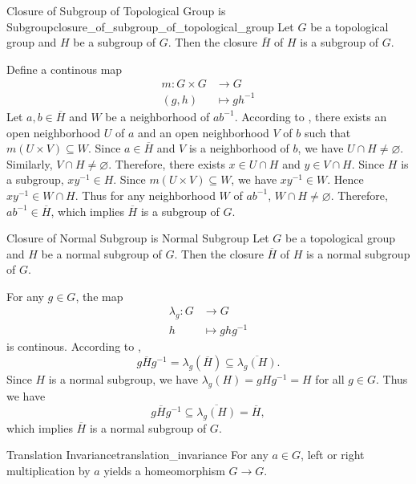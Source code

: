 \documentclass{report}
\begin{document}
\begin{proposition}{Closure of Subgroup of Topological Group is Subgroup}{closure_of_subgroup_of_topological_group}
	Let $G$ be a topological group and $H$ be a subgroup of $G$. Then the closure $\overline{H}$ of $H$ is a subgroup of $G$.
\end{proposition}
\begin{prf}
	 Define a continous map 
	\begin{align*}
		m:G\times G & \longrightarrow G \\
		(g,h)         & \longmapsto gh^{-1}
	\end{align*}
	Let $a,b\in \overline{H}$ and $W$ be a neighborhood of $ab^{-1}$. According to , there exists an open neighborhood $U$ of $a$ and an open neighborhood $V$ of $b$ such that $m(U\times V)\subseteq W$. Since $a \in \overline{H}$ and $V$ is a neighborhood of $b$, we have $U\cap H\ne \varnothing$. Similarly, $V\cap H\ne \varnothing$. Therefore, there exists $x\in U \cap H$ and $y\in V\cap H$. Since $H$ is a subgroup, $xy^{-1}\in H$. Since $m(U\times V)\subseteq W$, we have $xy^{-1}\in W$. Hence $xy^{-1}\in W\cap H$.
	Thus for any neighborhood $W$ of $ab^{-1}$, $W\cap H\ne \varnothing$. Therefore, $ab^{-1}\in \overline{H}$, which implies $\overline{H}$ is a subgroup of $G$.
\end{prf}

\begin{proposition}{Closure of Normal Subgroup is Normal Subgroup}{}
	Let $G$ be a topological group and $H$ be a normal subgroup of $G$. Then the closure $\overline{H}$ of $H$ is a normal subgroup of $G$.
\end{proposition}
\begin{prf}
	For any $g\in G$, the map
	\begin{align*}
		\lambda_g:G & \longrightarrow G \\
		h         & \longmapsto ghg^{-1}
	\end{align*}
	is continous. According to , 
	\[
		g \overline{H} g^{-1}=\lambda_g(\overline{H})\subseteq \overline{\lambda_g(H)}.
	\]
	Since $H$ is a normal subgroup, we have $\lambda_g(H)=gHg^{-1}=H$ for all $g\in G$.  Thus we have
	\[
	g \overline{H} g^{-1}\subseteq \overline{\lambda_g(H)}= \overline{H},
	\]
	which implies $\overline{H}$ is a normal subgroup of $G$.
\end{prf}



\begin{proposition}{Translation Invariance}{translation_invariance}
	For any $a \in G$, left or right multiplication by $a$ yields a homeomorphism $G \rightarrow G$.
\end{proposition}
\end{document}
